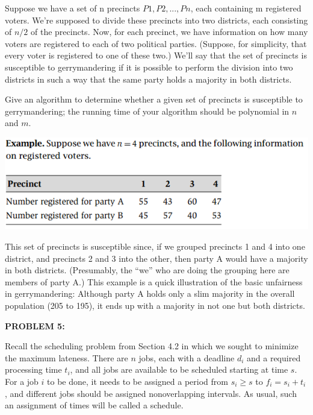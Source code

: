 \documentclass[11pt]{article}
\begin{document}
Suppose we have a set of n precincts $P1, P2, ..., Pn$, each containing m registered voters. We're supposed to divide these precincts into two districts, each consisting of $n/2$ of the precincts. Now, for each precinct, we have information on how many voters are registered to each of two political parties. (Suppose, for simplicity, that every voter is registered to one of these two.) We'll say that the set of precincts is susceptible to gerrymandering if it is possible to perform the division into two districts in such a way that the same party holds a majority in both districts.

Give an algorithm to determine whether a given set of precincts is susceptible to gerrymandering; the running time of your algorithm should be polynomial in $n$ and $m$. 

\vspace{2mm}

\includegraphics[scale=0.75]{3.png}

\vspace{2mm}

This set of precincts is susceptible since, if we grouped precincts 1 and 4 into one district, and precincts 2 and 3 into the other, then party A would have a majority in both districts. (Presumably, the ``we'' who are doing the grouping here are members of party A.) This example is a quick illustration of the basic unfairness in gerrymandering: Although party A holds only a slim majority in the overall population (205 to 195), it ends up with a majority in not one but both districts.

\vspace{6mm}

\noindent \textbf{PROBLEM 5: }

\vspace{2mm}

Recall the scheduling problem from Section 4.2 in which we sought to minimize the maximum lateness. There are $n$ jobs, each with a deadline $d_i$ and a required processing time $t_i$, and all jobs are available to be scheduled starting at time $s$. For a job $i$ to be done, it needs to be assigned a period from $s_i \ge s$ to $f_i = s_i + t_i$, and different jobs should be assigned nonoverlapping intervals. As usual, such an assignment of times will be called a schedule. 
\end{document}
